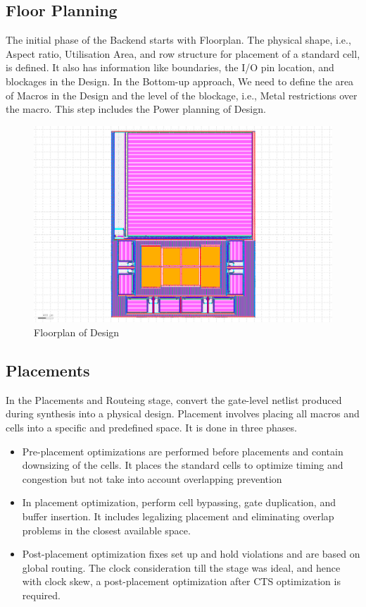\subsection{Floor Planning}
The initial phase of the Backend starts with Floorplan. The physical shape, i.e., Aspect ratio, Utilisation Area, and row structure for placement of a standard cell, is defined. It also has information like boundaries, the I/O pin location, and blockages in the Design. In the Bottom-up approach, We need to define the area of Macros in the Design and the level of the blockage, i.e., Metal restrictions over the macro. This step includes the Power planning of Design.

\begin{figure}[h]
  \centering
  \includegraphics[width = 0.8\linewidth]{./ASIC/FP.png}
  \caption{Floorplan of Design}
\end{figure}

\subsection{Placements}
In the Placements and Routeing stage, convert the gate-level netlist produced during synthesis into a physical design. Placement involves placing all macros and cells into a specific and predefined space. It is done in three phases.
\begin{itemize}
\item Pre-placement optimizations are performed before placements and contain downsizing of the cells. It places the standard cells to optimize timing and congestion but not take into account overlapping prevention
\item In placement optimization, perform cell bypassing, gate duplication, and buffer insertion. It includes legalizing placement and eliminating overlap problems in the closest available space.
\item Post-placement optimization fixes set up and hold violations and are based on global routing. The clock consideration till the stage was ideal, and hence with clock skew, a post-placement optimization after CTS optimization is required.
\end{itemize}

